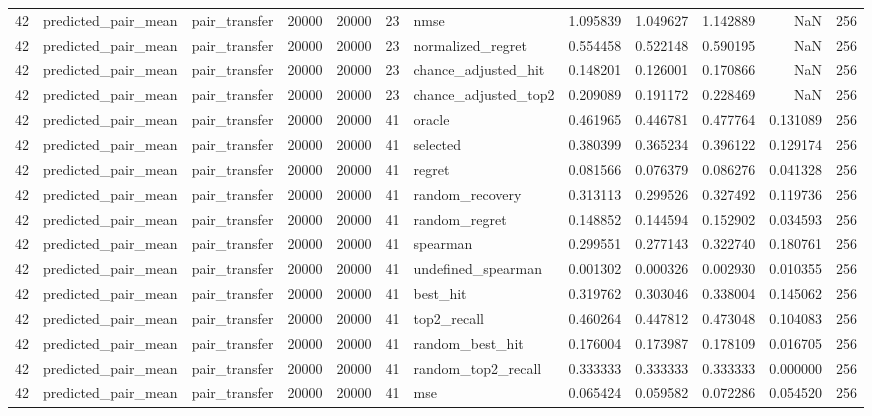 \begin{tabular}{rllrrrlrrrrr}
42 & predicted_pair_mean & pair_transfer & 20000 & 20000 & 23 & nmse & 1.095839 & 1.049627 & 1.142889 & NaN & 256 \\
42 & predicted_pair_mean & pair_transfer & 20000 & 20000 & 23 & normalized_regret & 0.554458 & 0.522148 & 0.590195 & NaN & 256 \\
42 & predicted_pair_mean & pair_transfer & 20000 & 20000 & 23 & chance_adjusted_hit & 0.148201 & 0.126001 & 0.170866 & NaN & 256 \\
42 & predicted_pair_mean & pair_transfer & 20000 & 20000 & 23 & chance_adjusted_top2 & 0.209089 & 0.191172 & 0.228469 & NaN & 256 \\
42 & predicted_pair_mean & pair_transfer & 20000 & 20000 & 41 & oracle & 0.461965 & 0.446781 & 0.477764 & 0.131089 & 256 \\
42 & predicted_pair_mean & pair_transfer & 20000 & 20000 & 41 & selected & 0.380399 & 0.365234 & 0.396122 & 0.129174 & 256 \\
42 & predicted_pair_mean & pair_transfer & 20000 & 20000 & 41 & regret & 0.081566 & 0.076379 & 0.086276 & 0.041328 & 256 \\
42 & predicted_pair_mean & pair_transfer & 20000 & 20000 & 41 & random_recovery & 0.313113 & 0.299526 & 0.327492 & 0.119736 & 256 \\
42 & predicted_pair_mean & pair_transfer & 20000 & 20000 & 41 & random_regret & 0.148852 & 0.144594 & 0.152902 & 0.034593 & 256 \\
42 & predicted_pair_mean & pair_transfer & 20000 & 20000 & 41 & spearman & 0.299551 & 0.277143 & 0.322740 & 0.180761 & 256 \\
42 & predicted_pair_mean & pair_transfer & 20000 & 20000 & 41 & undefined_spearman & 0.001302 & 0.000326 & 0.002930 & 0.010355 & 256 \\
42 & predicted_pair_mean & pair_transfer & 20000 & 20000 & 41 & best_hit & 0.319762 & 0.303046 & 0.338004 & 0.145062 & 256 \\
42 & predicted_pair_mean & pair_transfer & 20000 & 20000 & 41 & top2_recall & 0.460264 & 0.447812 & 0.473048 & 0.104083 & 256 \\
42 & predicted_pair_mean & pair_transfer & 20000 & 20000 & 41 & random_best_hit & 0.176004 & 0.173987 & 0.178109 & 0.016705 & 256 \\
42 & predicted_pair_mean & pair_transfer & 20000 & 20000 & 41 & random_top2_recall & 0.333333 & 0.333333 & 0.333333 & 0.000000 & 256 \\
42 & predicted_pair_mean & pair_transfer & 20000 & 20000 & 41 & mse & 0.065424 & 0.059582 & 0.072286 & 0.054520 & 256 \\

\end{tabular}

